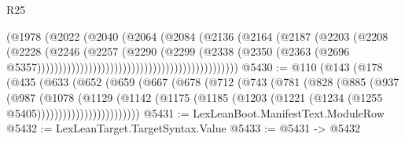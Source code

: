 \begin{lexlean}{R25}
\begin{coremodule}
{{{{{{{{{{{{{{{{{{{{{{{{{{{{{{{{{{{{{{{{{{{{{{{{{{{{{{{{{{{{{{{{{{{{{{{{{{{{{{{{{{{{{{{{{{{{{{{{{{{{{{{{{{{{{{{{{{{{{{{{{{{{{{{{{{{{{{{{{{{{{{{{{{{{{{{{{{{{{{{{{{{{{{{{{{{{{{{{{{{{{{{{{{{{{{{{{{{{{{{                                                            (@1978
                                                              (@2022
                                                                (@2040
                                                                  (@2064
                                                                    (@2084
                                                                      (@2136
                                                                        (@2164
                                                                          (@2187
                                                                            (@2203
                                                                              (@2208
                                                                                (@2228
                                                                                  (@2246
                                                                                    (@2257
                                                                                      (@2290
                                                                                        (@2299
                                                                                          (@2338
                                                                                            (@2350
                                                                                              (@2363
                                                                                                (@2696
                                                                                                  @5357)))))))))))))))))))))))))))))))))))))))))))))))
@5430 := @110
    (@143
      (@178
        (@435
          (@633
            (@652
              (@659
                (@667
                  (@678
                    (@712
                      (@743
                        (@781
                          (@828
                            (@885
                              (@937
                                (@987
                                  (@1078
                                    (@1129
                                      (@1142
                                        (@1175
                                          (@1185
                                            (@1203
                                              (@1221 (@1234 (@1255 @5405))))))))))))))))))))))))
@5431 := LexLeanBoot.ManifestText.ModuleRow
@5432 := LexLeanTarget.TargetSyntax.Value
@5433 := @5431 -> @5432
}}}}}}}}}}}}}}}}}}}}}}}}}}}}}}}}}}}}}}}}}}}}}}}}}}}}}}}}}}}}}}}}}}}}}}}}}}}}}}}}}}}}}}}}}}}}}}}}}}}}}}}}}}}}}}}}}}}}}}}}}}}}}}}}}}}}}}}}}}}}}}}}}}}}}}}}}}}}}}}}}}}}}}}}}}}}}}}}}}}}}}}}}}}}}}}}}}}}}}}
\end{coremodule}
\end{lexlean}
